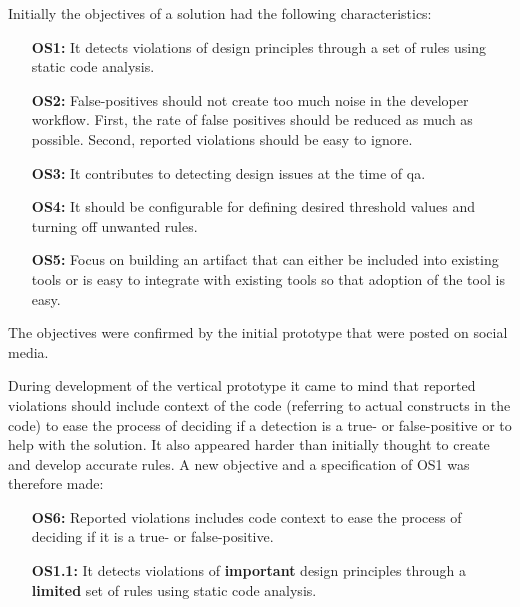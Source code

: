 \documentclass{report}
\begin{document}
Initially the objectives of a solution had the following characteristics:

\begin{itemize}
    \item [\textbf{OS1:}] It detects violations of design principles through a set of rules using static code analysis.
    \item [\textbf{OS2:}] False-positives should not create too much noise in the developer workflow. First, the rate of false positives should be reduced as much as possible. Second, reported violations should be easy to ignore. 
    \item [\textbf{OS3:}] It contributes to detecting design issues at the time of \gls{qa}.
    
    \item [\textbf{OS4:}] It should be configurable for defining desired threshold values and turning off unwanted rules.
    \item [\textbf{OS5:}] Focus on building an artifact that can either be included into existing tools or is easy to integrate with existing tools so that adoption of the tool is easy.
\end{itemize}

The objectives were confirmed by the initial prototype that were posted on social media. 



During development of the vertical prototype it came to mind that reported violations should include context of the code (referring to actual constructs in the code) to ease the process of deciding if a detection is a true- or false-positive or to help with the solution. It also appeared harder than initially thought to create and develop accurate rules. A new objective and a specification of OS1 was therefore made: 


\begin{itemize}
    \item [\textbf{OS6:}] Reported violations includes code context to ease the process of deciding if it is a true- or false-positive. 
    \item [\textbf{OS1.1:}] It detects violations of \textbf{important} design principles through a \textbf{limited} set of rules using static code analysis.
\end{itemize}
\end{document}

